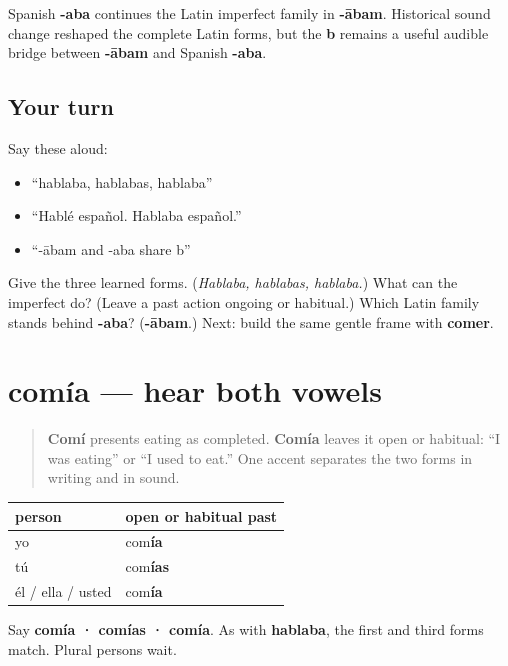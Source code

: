 \begin{cousinweb}
Spanish \textbf{-aba} continues the Latin imperfect family in \textbf{-ābam}. Historical sound change reshaped the complete Latin forms, but the \textbf{b} remains a useful audible bridge between \textbf{-ābam} and Spanish \textbf{-aba}.
\end{cousinweb}

\subsection*{Your turn}
Say these aloud:

\begin{itemize}
\raggedright
  \item “hablaba, hablabas, hablaba”
  \item “Hablé español. Hablaba español.”
  \item “-ābam and -aba share b”
\end{itemize}

\begin{tcolorbox}[breakable,colback=teal!4,colframe=teal!35!black,title={Before you move on}]
Give the three learned forms. (\emph{Hablaba, hablabas, hablaba.}) What can the imperfect do? (Leave a past action ongoing or habitual.) Which Latin family stands behind \textbf{-aba}? (\textbf{-ābam}.) Next: build the same gentle frame with \textbf{comer}.
\end{tcolorbox}
\section[comía]{comía — hear both vowels}

\label{lesson:ES-C16-comer-imperfecto}



\begin{quote}
\textbf{Comí} presents eating as completed. \textbf{Comía} leaves it open or habitual: “I was eating” or “I used to eat.” One accent separates the two forms in writing and in sound.
\end{quote}

\begin{grammarlens}[title={Grammar Lens: the singular -er row}]
\noindent
\begin{tabularx}{\linewidth}{@{}>{\raggedright\arraybackslash}X>{\raggedright\arraybackslash}X@{}}
\toprule
\textbf{person} & \textbf{open or habitual past} \\
\midrule
yo & com\textbf{ía} \\
tú & com\textbf{ías} \\
él / ella / usted & com\textbf{ía} \\
\bottomrule
\end{tabularx}

Say \textbf{comía · comías · comía}. As with \textbf{hablaba}, the first and third forms match. Plural persons wait.
\end{grammarlens}

